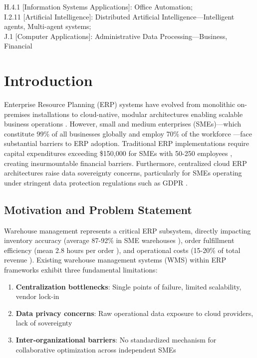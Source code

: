 \documentclass[times,10pt,twocolumn]{jucs2e}
\begin{document}
\begin{classification}
H.4.1 [Information Systems Applications]: Office Automation;\\
I.2.11 [Artificial Intelligence]: Distributed Artificial Intelligence---Intelligent agents, Multi-agent systems;\\
J.1 [Computer Applications]: Administrative Data Processing---Business, Financial
\end{classification}


\section{Introduction}

Enterprise Resource Planning (ERP) systems have evolved from monolithic on-premises installations to cloud-native, modular architectures enabling scalable business operations \cite{Smith2023}. However, small and medium enterprises (SMEs)---which constitute 99\% of all businesses globally and employ 70\% of the workforce \cite{OECD2024}---face substantial barriers to ERP adoption. Traditional ERP implementations require capital expenditures exceeding \$150,000 for SMEs with 50-250 employees \cite{Johnson2022}, creating insurmountable financial barriers. Furthermore, centralized cloud ERP architectures raise data sovereignty concerns, particularly for SMEs operating under stringent data protection regulations such as GDPR \cite{Brown2023}.

\subsection{Motivation and Problem Statement}

Warehouse management represents a critical ERP subsystem, directly impacting inventory accuracy (average 87-92\% in SME warehouses \cite{Davis2023}), order fulfillment efficiency (mean 2.8 hours per order \cite{Garcia2024}), and operational costs (15-20\% of total revenue \cite{White2022}). Existing warehouse management systems (WMS) within ERP frameworks exhibit three fundamental limitations:

\begin{enumerate}
\item \textbf{Centralization bottlenecks}: Single points of failure, limited scalability, vendor lock-in \cite{Anderson2023}
\item \textbf{Data privacy concerns}: Raw operational data exposure to cloud providers, lack of sovereignty \cite{Martinez2024}
\item \textbf{Inter-organizational barriers}: No standardized mechanism for collaborative optimization across independent SMEs \cite{Thompson2023}
\end{enumerate}
\end{document}
